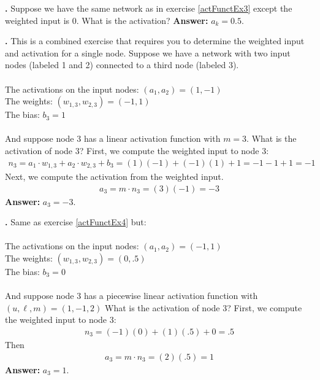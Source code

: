 \bigskip

\noindent
{\bf \theActFunctionCounter.} Suppose we have the same network as in exercise \ref{actFunctEx3} except the weighted input is $0$. What is the activation?  {\bf Answer:} $a_k = 0.5$. 

\bigskip

\label{actFunctEx4}
\noindent
{\bf \theActFunctionCounter.} This is a combined exercise that requires you to determine 
the weighted input and activation for a single node. Suppose we have a network with 
two input nodes (labeled 1 and 2) connected to a third node (labeled 3). \\ \\
\indent \qquad\qquad The activations on the input nodes: $(a_1,a_2) = (1,-1)$\\
\indent \qquad\qquad The weights: $(w_{1,3}, w_{2,3}) = (-1,1)$ \\
\indent \qquad\qquad The bias: $b_3 = 1$ \\ \\
And suppose node 3 has a linear activation function with $m=3$. What is the 
activation of node 3?  First, we compute the weighted input to node 3:
\begin{eqnarray*}
n_3 = a_1 \cdot w_{1,3}  + a_2 \cdot w_{2,3} + b_{3} 
    =     (1)(-1)        +     (-1)(1)       + 1     
    = -1 -1 + 1 = -1
\end{eqnarray*}
Next, we compute the activation from the weighted input.
\begin{eqnarray*}
a_3 = m \cdot n_3  = (3)(-1) = -3
\end{eqnarray*}
{\bf Answer:}  $a_3=-3$.

\bigskip

\noindent
{\bf \theActFunctionCounter.} Same as exercise \ref{actFunctEx4} but: \\ \\
\indent \qquad\qquad The activations on the input nodes: $(a_1,a_2) = (-1,1)$\\
\indent \qquad\qquad The weights: $(w_{1,3}, w_{2,3}) = (0,.5)$ \\
\indent \qquad\qquad The bias: $b_3 = 0$ \\ \\
And suppose node 3 has a piecewise linear activation function with $(u,\ell,m) = (1,-1,2)$ What is the 
activation of node 3?  First, we compute the weighted input to node 3:
\begin{eqnarray*}
n_3 =  (-1)(0)        +     (1)(.5)       + 0 = .5
\end{eqnarray*}
Then 
\begin{eqnarray*}
a_3 = m \cdot n_3  = (2)(.5) = 1
\end{eqnarray*}
{\bf Answer:}  $a_3=1$.

